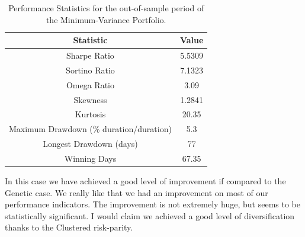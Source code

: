 \begin{table}
	\centering
	\begin{tabular}{c|c}
		\textbf{Statistic} & \textbf{Value} \\\hline
		Sharpe Ratio & 5.5309 \\ 
		Sortino Ratio & 7.1323 \\ 
		Omega Ratio & 3.09 \\ 
		Skewness & 1.2841 \\ 
		Kurtosis & 20.35 \\ 
		Maximum Drawdown (\% duration/duration) & 5.3 \\ 
		Longest Drawdown (days) & 77 \\ 
		Winning Days & 67.35 \\ 
	\end{tabular}
	\caption{\label{table:oos_perf_benchmark_2} Performance Statistics for the out-of-sample period of the Minimum-Variance Portfolio.}
\end{table}

In this case we have achieved a good level of improvement if compared to the Genetic case. We really like that we had an improvement on most of our performance indicators. The improvement is not extremely huge, but seems to be statistically significant. I would claim we achieved a good level of diversification thanks to the Clustered risk-parity.